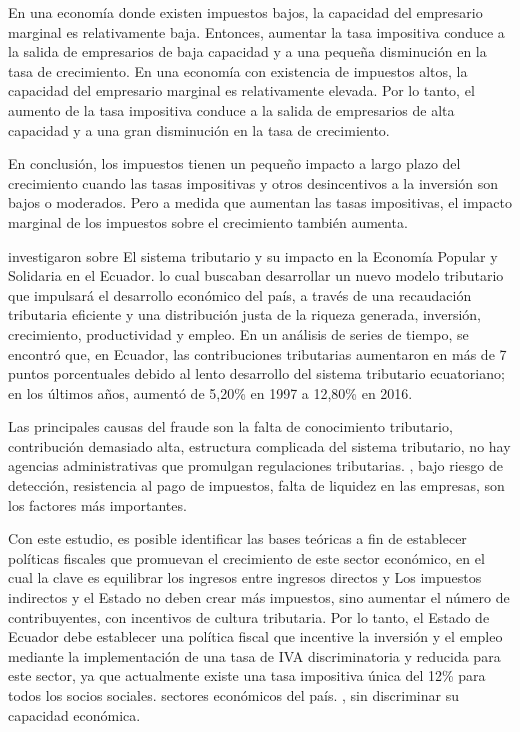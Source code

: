 \documentclass[
  letterpaper,
]{article}
\begin{document}
En una economía donde existen impuestos bajos, la capacidad del
empresario marginal es relativamente baja. Entonces, aumentar la tasa
impositiva conduce a la salida de empresarios de baja capacidad y a una
pequeña disminución en la tasa de crecimiento. En una economía con
existencia de impuestos altos, la capacidad del empresario marginal es
relativamente elevada. Por lo tanto, el aumento de la tasa impositiva
conduce a la salida de empresarios de alta capacidad y a una gran
disminución en la tasa de crecimiento.

En conclusión, los impuestos tienen un pequeño impacto a largo plazo del
crecimiento cuando las tasas impositivas y otros desincentivos a la
inversión son bajos o moderados. Pero a medida que aumentan las tasas
impositivas, el impacto marginal de los impuestos sobre el crecimiento
también aumenta.

\textcite{campos_sistema_2018} investigaron sobre El sistema tributario
y su impacto en la Economía Popular y Solidaria en el Ecuador. lo cual
buscaban desarrollar un nuevo modelo tributario que impulsará el
desarrollo económico del país, a través de una recaudación tributaria
eficiente y una distribución justa de la riqueza generada, inversión,
crecimiento, productividad y empleo. En un análisis de series de tiempo,
se encontró que, en Ecuador, las contribuciones tributarias aumentaron
en más de 7 puntos porcentuales debido al lento desarrollo del sistema
tributario ecuatoriano; en los últimos años, aumentó de 5,20\% en 1997 a
12,80\% en 2016.

Las principales causas del fraude son la falta de conocimiento
tributario, contribución demasiado alta, estructura complicada del
sistema tributario, no hay agencias administrativas que promulgan
regulaciones tributarias. , bajo riesgo de detección, resistencia al
pago de impuestos, falta de liquidez en las empresas, son los factores
más importantes.

Con este estudio, es posible identificar las bases teóricas a fin de
establecer políticas fiscales que promuevan el crecimiento de este
sector económico, en el cual la clave es equilibrar los ingresos entre
ingresos directos y Los impuestos indirectos y el Estado no deben crear
más impuestos, sino aumentar el número de contribuyentes, con incentivos
de cultura tributaria. Por lo tanto, el Estado de Ecuador debe
establecer una política fiscal que incentive la inversión y el empleo
mediante la implementación de una tasa de IVA discriminatoria y reducida
para este sector, ya que actualmente existe una tasa impositiva única
del 12\% para todos los socios sociales. sectores económicos del país. ,
sin discriminar su capacidad económica.
\end{document}
